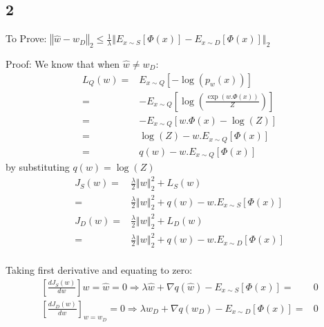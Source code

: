 \documentclass{article}
\begin{document}
\subsection*{2}
\begin{description}
  \item{To Prove:} $\left\Vert \hat{w}-w_{D}\right\Vert _{2}\leq\frac{1}{\lambda}\left\Vert E_{x\sim S}\left[\Phi\left(x\right)\right]-E_{x\sim D}\left[\Phi\left(x\right)\right]\right\Vert _{2}$
  \item{Proof:}
    We know that when $ \hat{w}\neq w_{D} $:
    \begin{align*}
      L_{Q}(w)= & E_{x\sim Q}\left[-\log\left(p_{w}\left(x\right)\right)\right] \\
      = & -E_{x\sim Q}\left[\log\left(\frac{\exp\left(w.\Phi\left(x\right)\right)}{Z}\right)\right] \\
      = &-E_{x\sim Q}\left[w.\Phi\left(x\right)-\log\left(Z\right)\right] \\
      = & \log\left(Z\right)-w.E_{x\sim Q}\left[\Phi\left(x\right)\right] \\
      = & q\left(w\right)-w.E_{x\sim Q}\left[\Phi\left(x\right)\right]
    \end{align*}
    by substituting $ q(w)=\log(Z)$
    \begin{align*}
      J_{S}(w) = & \frac{\lambda}{2}\left\Vert w\right\Vert _{2}^{2}+L_{S}(w) \\
      = & \frac{\lambda}{2}\left\Vert w\right\Vert _{2}^{2}+q\left(w\right)-w.E_{x\sim S}\left[\Phi\left(x\right)\right] \\
      J_{D}(w)= & \frac{\lambda}{2}\left\Vert w\right\Vert _{2}^{2}+L_{D}(w) \\
      = & \frac{\lambda}{2}\left\Vert w\right\Vert _{2}^{2}+q\left(w\right)-w.E_{x\sim D}\left[\Phi\left(x\right)\right] \\
    \end{align*}

    Taking first derivative and equating to zero:
    \begin{align*}
      {\left[\frac{dJ_{S}(w)}{dw}\right]} {w=\hat{w}}=0\Rightarrow\lambda\hat{w}+\nabla q(\hat{w})-E_{x\sim S}\left[\Phi\left(x\right)\right] = & 0 \\
      {\left[\frac{dJ_{D}(w)}{dw}\right]}_{w=w_{D}}=0\Rightarrow\lambda w_{D}+\nabla q(w_{D})-E_{x\sim D}\left[\Phi\left(x\right)\right]= & 0 \\
    \end{align*}


\end{description}
\end{document}
